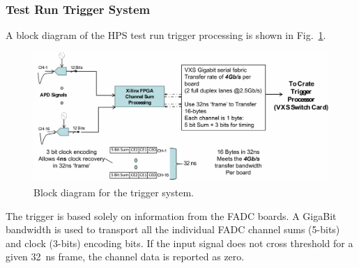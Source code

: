 \subsubsection{Test Run Trigger System}
\label{sec:testrun_trigger}
A block diagram of the HPS test run trigger processing is shown in Fig.~\ref{fig:trigger_diagram}.  
\begin{figure}[]
\includegraphics[scale=0.6]{test2012/trigger/HPSChanSum_001.jpg}
\caption{\small{Block diagram for the trigger system.}}
\label{fig:trigger_diagram}
\end{figure}
The trigger is based solely on information from the FADC boards. A GigaBit bandwidth is used to transport all the 
individual FADC channel sums (5-bits) and clock (3-bits) encoding bits. 
If the input signal does not cross threshold for a given 32~ns frame, the channel data is reported as zero.

